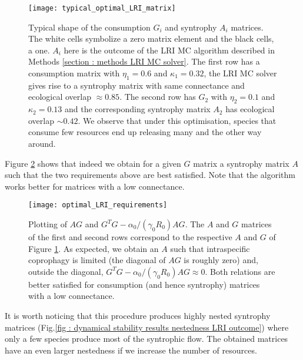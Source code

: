 \documentclass[12pt, titlepage]{report}
\begin{document}
\begin{figure}
\texttt{[image: typical\_optimal\_LRI\_matrix]}
\caption{Typical shape of the consumption $G_i$ and syntrophy $A_i$ matrices. The white cells symbolize a zero matrix element and the black cells, a one. $A_i$ here is the outcome of the LRI MC algorithm described in Methods \ref{section : methods LRI MC solver}. The first row has a consumption matrix with $\eta_1=0.6$ and $\kappa_1=0.32$, the LRI MC solver gives rise to a syntrophy matrix with same connectance and ecological overlap $\approx 0.85$. The second row has $G_2$ with $\eta_2=0.1$ and $\kappa_2=0.13$ and the corresponding syntrophy matrix $A_2$ has ecological overlap $\sim 0.42$. We observe that under this optimisation, species that consume few resources end up releasing many and the other way around.}\label{fig : dynamical stability results typical shape of consumption syntrophy LRI algorithm}
\end{figure}
Figure \ref{fig : dynamical stability optimal LRI requirements met} shows that indeed we obtain for a given $G$ matrix a syntrophy matrix $A$ such that the two requirements above are best satisfied. Note that the algorithm works better for matrices with a low connectance.
\begin{figure}
  \begin{minipage}[c]{0.67\textwidth}
    \texttt{[image: optimal\_LRI\_requirements]}
  \end{minipage}\hfill
  \begin{minipage}[c]{0.3\textwidth}
    \caption{Plotting of $AG$ and $G^TG-\alpha_0/(\gamma_0R_0) AG$. The $A$ and $G$ matrices of the first and second rows correspond to the respective $A$ and $G$ of Figure \ref{fig : dynamical stability results typical shape of consumption syntrophy LRI algorithm}. As expected, we obtain an $A$ such that intraspecific coprophagy is limited (the diagonal of $AG$ is roughly zero) and, outside the diagonal, $G^TG-\alpha_0/(\gamma_0R_0) AG \approx 0$. Both relations are better satisfied for consumption (and hence syntrophy) matrices with a low connectance.}\label{fig : dynamical stability optimal LRI requirements met}
  \end{minipage}
\end{figure}
It is worth noticing that this procedure produces highly nested syntrophy matrices (Fig.\ref{fig : dynamical stability results nestedness LRI outcome}) where only a few species produce most of the syntrophic flow. The obtained matrices have an even larger nestedness if we increase the number of resources.
\end{document}
